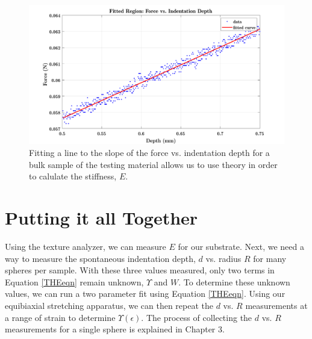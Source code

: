\begin{figure}
	\centering
	\includegraphics[width=.9\linewidth]{Chapters/Figures/fittedRegionexample}
	\caption[Bulk stiffness Fit]{Fitting a line to the slope of the force vs. indentation depth for a bulk sample of the testing material allows us to use theory in order to calulate the stiffness, $E$.}
	\label{fig:fittedregionexample}
\end{figure}



\section{Putting it all Together}
Using the texture analyzer, we can measure $ E $ for our substrate. Next, we need a way to measure the spontaneous indentation depth, $ d $ vs. radius $ R $ for many spheres per sample. With these three values measured, only two terms in Equation \ref{THEeqn} remain unknown, $ \Upsilon $ and $ W $. To determine these unknown values, we can run a two parameter fit using Equation \ref{THEeqn}. Using our equibiaxial stretching apparatus, we can then repeat the $ d $ vs. $ R $ measurements at a range of strain to determine $ \Upsilon(\epsilon) $. The process of collecting the $ d $ vs. $ R $ measurements for a single sphere is explained in Chapter 3.

%